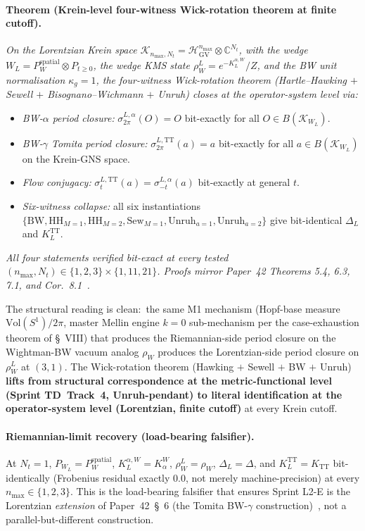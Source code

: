 \documentclass[11pt]{article}
\begin{document}
\paragraph{Theorem (Krein-level four-witness Wick-rotation theorem at
finite cutoff).}\label{thm:krein_four_witness_paper32}
\emph{On the Lorentzian Krein space
$\mathcal{K}_{n_{\max}, N_t} = \mathcal{H}_{\mathrm{GV}}^{n_{\max}}
\otimes \mathbb{C}^{N_t}$, with the wedge
$W_L = P_W^{\mathrm{spatial}} \otimes P_{t \geq 0}$, the wedge KMS
state $\rho_W^L = e^{-K_L^{\alpha, W}}/Z$, and the BW unit normalisation
$\kappa_g = 1$, the four-witness Wick-rotation theorem
(Hartle--Hawking $+$ Sewell $+$ Bisognano--Wichmann $+$ Unruh) closes at
the operator-system level via:}
\begin{itemize}\setlength{\itemsep}{2pt}
\item \emph{BW-$\alpha$ period closure:} $\sigma_{2\pi}^{L, \alpha}(O) = O$
bit-exactly for all $O \in B(\mathcal{K}_{W_L})$.
\item \emph{BW-$\gamma$ Tomita period closure:} $\sigma_{2\pi}^{L, \mathrm{TT}}(a) = a$
bit-exactly for all $a \in B(\mathcal{K}_{W_L})$ on the Krein-GNS space.
\item \emph{Flow conjugacy:} $\sigma_t^{L, \mathrm{TT}}(a) = \sigma_{-t}^{L, \alpha}(a)$
bit-exactly at general $t$.
\item \emph{Six-witness collapse:} all six instantiations
$\{\mathrm{BW},\mathrm{HH}_{M=1},\mathrm{HH}_{M=2},\mathrm{Sew}_{M=1},
\mathrm{Unruh}_{a=1},\mathrm{Unruh}_{a=2}\}$ give bit-identical
$\Delta_L$ and $K_L^{\mathrm{TT}}$.
\end{itemize}
\emph{All four statements verified bit-exact at every tested
$(n_{\max}, N_t) \in \{1, 2, 3\} \times \{1, 11, 21\}$.  Proofs mirror
Paper~42 Theorems 5.4, 6.3, 7.1, and Cor.~8.1~\cite{paper42}.}

The structural reading is clean:\ the same M1 mechanism (Hopf-base
measure $\mathrm{Vol}(S^1)/2\pi$, master Mellin engine $k = 0$
sub-mechanism per the case-exhaustion theorem of \S~VIII) that
produces the Riemannian-side period closure on the Wightman-BW
vacuum analog $\rho_W$ produces the Lorentzian-side period closure on
$\rho_W^L$ at $(3, 1)$.  The Wick-rotation theorem (Hawking $+$ Sewell
$+$ BW $+$ Unruh) \textbf{lifts from structural correspondence at the
metric-functional level (Sprint TD~Track~4, Unruh-pendant) to literal
identification at the operator-system level (Lorentzian, finite
cutoff)} at every Krein cutoff.

\paragraph{Riemannian-limit recovery (load-bearing falsifier).}
At $N_t = 1$, $P_{W_L} = P_W^{\mathrm{spatial}}$,
$K_L^{\alpha, W} = K_\alpha^W$, $\rho_W^L = \rho_W$,
$\Delta_L = \Delta$, and $K_L^{\mathrm{TT}} = K_{\mathrm{TT}}$
bit-identically (Frobenius residual exactly $0.0$, not merely
machine-precision) at every $n_{\max} \in \{1, 2, 3\}$.  This is the
load-bearing falsifier that ensures Sprint L2-E is the Lorentzian
\emph{extension} of Paper~42~\S~6 (the Tomita BW-$\gamma$
construction)~\cite{paper42}, not a parallel-but-different construction.
\end{document}
